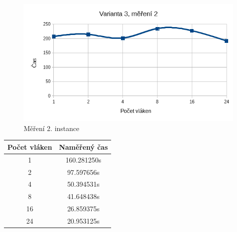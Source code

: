 \documentclass[12pt]{article}
\begin{document}
\begin{figure}[H]
  \begin{center}
      \includegraphics[width=12cm]{images/ssef2.png}
    \caption{Měření 2. instance} 
  \end{center}
\end{figure}
%
%
\begin{center}
\begin{tabular}{ c | c }
\textbf{Počet vláken} & \textbf{Naměřený čas} \\ \hline \hline 
1 & 160.281250s \\ \hline
2 & 97.597656s \\ \hline
4 & 50.394531s \\ \hline
8 & 41.648438s \\ \hline
16 & 26.859375s \\ \hline
24 & 20.953125s \\ \hline
\end{tabular}
\end{center}
\end{document}
